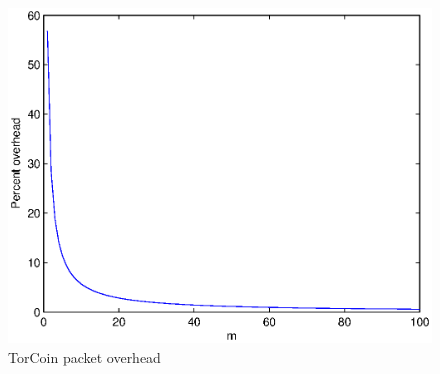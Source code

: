 \begin{figure}
  \centering
    \includegraphics[scale=0.6]{graph.eps}
  \caption{TorCoin packet overhead}
\end{figure}